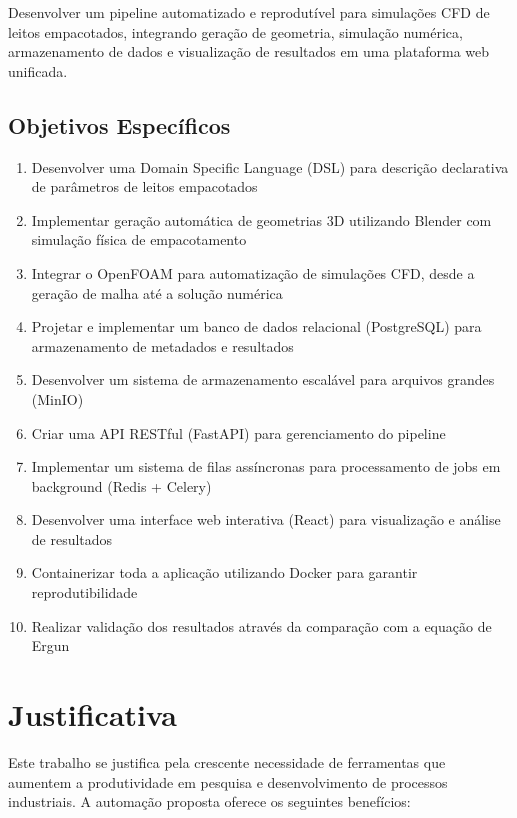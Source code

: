 Desenvolver um pipeline automatizado e reprodutível para simulações CFD de leitos empacotados, integrando geração de geometria, simulação numérica, armazenamento de dados e visualização de resultados em uma plataforma web unificada.

\subsection{Objetivos Específicos}

\begin{enumerate}
    \item Desenvolver uma Domain Specific Language (DSL) para descrição declarativa de parâmetros de leitos empacotados
    \item Implementar geração automática de geometrias 3D utilizando Blender com simulação física de empacotamento
    \item Integrar o OpenFOAM para automatização de simulações CFD, desde a geração de malha até a solução numérica
    \item Projetar e implementar um banco de dados relacional (PostgreSQL) para armazenamento de metadados e resultados
    \item Desenvolver um sistema de armazenamento escalável para arquivos grandes (MinIO)
    \item Criar uma API RESTful (FastAPI) para gerenciamento do pipeline
    \item Implementar um sistema de filas assíncronas para processamento de jobs em background (Redis + Celery)
    \item Desenvolver uma interface web interativa (React) para visualização e análise de resultados
    \item Containerizar toda a aplicação utilizando Docker para garantir reprodutibilidade
    \item Realizar validação dos resultados através da comparação com a equação de Ergun
\end{enumerate}

\section{Justificativa}

Este trabalho se justifica pela crescente necessidade de ferramentas que aumentem a produtividade em pesquisa e desenvolvimento de processos industriais. A automação proposta oferece os seguintes benefícios:

